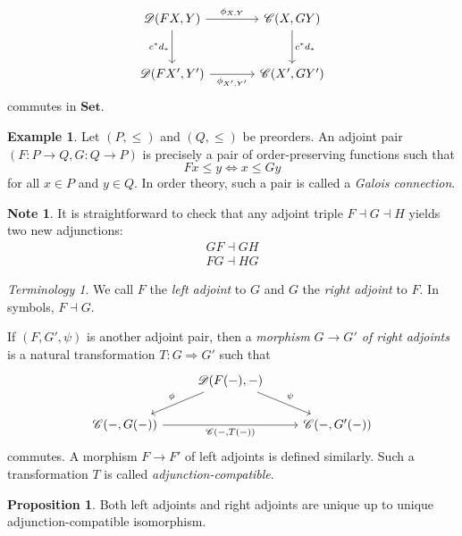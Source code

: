 \documentclass[10pt,letterpaper,cm]{nupset}
\theoremstyle{definition}
\newtheorem{exmp}[definition]{Example}
\newtheorem{note}[definition]{Note}
\theoremstyle{theorem}
\newtheorem{prop}[definition]{Proposition}
\theoremstyle{remark}
\newtheorem*{term}{Terminology}
\newcommand{\1}{\mathbf{1}}
\renewcommand{\c}{\mathscr{C}}
\renewcommand{\d}{\mathscr{D}}
\newcommand{\0}{\vec 0}
\begin{document}
\[
\begin{tikzcd}[row sep=large, column sep = large]
\d(F{X}, Y) \arrow[r, "\phi_{X, Y}"] \arrow[d, "c^{\ast}d_{\ast}", swap]
& \c(X, G{Y}) \arrow[d, "c^{\ast}d_{\ast}"] \\
\d(F{X'}, Y')\arrow[r, "\phi_{X', Y'}"']
& \c(X', G{Y'})  
\end{tikzcd}
\] commutes in $\mathbf{Set}$.

\begin{exmp}
Let $\left(P, \leq\right)$ and $\left(Q, \leq\right)$ be preorders. An adjoint pair $\left(F: P \to Q, G: Q \to P\right)$ is precisely a pair of order-preserving functions such that 
\[
F{x} \leq y \iff x \leq G{y}
\] for all $x\in P$ and $y \in Q$. In order theory, such a pair is called a \textit{Galois connection}. 
\end{exmp}

\begin{note}
It is straightforward to check that any adjoint triple $F \dashv G \dashv H$ yields two new adjunctions:
\begin{gather*}
G{F} \dashv G{H}
\\ F{G} \dashv H{G}
\end{gather*}
\end{note}

\smallskip

\begin{term}
We call $F$ the \textit{left adjoint} to $G$ and $G$ the \textit{right adjoint} to $F$. In symbols, $F \dashv G$.
\end{term}

\smallskip

If $\left(F, G', \psi\right)$ is another adjoint pair, then a \textit{morphism $G \to G'$ of right adjoints} is a natural transformation $T : G \Rightarrow G'$ such that
\[
\begin{tikzcd}
	& {\d(F({-}), {-})} \\
	{\c({-}, G({-}))} && {\c({-}, G'({-}))}
	\arrow["{\c({-},T({-}))}"', from=2-1, to=2-3]
	\arrow["\phi"', from=1-2, to=2-1]
	\arrow["\psi", from=1-2, to=2-3]
\end{tikzcd}
\] commutes. A morphism $F \to F'$ of left adjoints is defined similarly. Such a transformation $T$ is called \textit{adjunction-compatible}.

\begin{prop}
Both left adjoints and right adjoints are unique up to unique adjunction-compatible isomorphism.
\end{prop}
\end{document}
